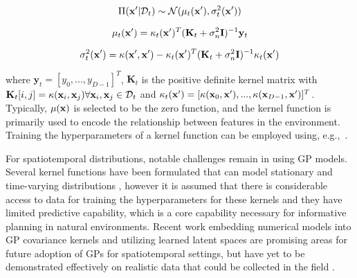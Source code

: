 \begin{equation}
    \Pi(\mathbf{x}' | \mathcal{D}_t) \sim \mathcal{N}(\mu_t(\mathbf{x}'),\sigma_t^2(\mathbf{x}'))
\end{equation}

\begin{equation}
    \mu_t(\mathbf{x}') = \kappa_t(\mathbf{x}')^T(\mathbf{K}_t + \sigma_n^2\mathbf{I})^{-1}\mathbf{y}_t
\end{equation}

\begin{equation}
    \sigma_t^2(\mathbf{x}') = \kappa(\mathbf{x}',\mathbf{x}') - \kappa_t(\mathbf{x}')^T(\mathbf{K}_t + \sigma_n^2 \mathbf{I})^{-1}\kappa_t(\mathbf{x}')
\end{equation}

\noindent where $\mathbf{y}_t = [y_0,...,y_{D-1}]^T$, $\mathbf{K}_t$ is the positive definite kernel matrix with $\mathbf{K}_t[i,j] = \kappa(\mathbf{x}_i,\mathbf{x}_j) \forall \mathbf{x}_i,\mathbf{x}_j \in \mathcal{D}_t$ and $\kappa_t(\mathbf{x}') = [\kappa(\mathbf{x}_0,\mathbf{x}'), ..., \kappa(\mathbf{x}_{D-1},\mathbf{x}')]^T$. Typically, $\mu(\mathbf{x})$ is selected to be the zero function, and the kernel function is primarily used to encode the relationship between features in the environment. Training the hyperparameters of a kernel function can be employed using, e.g.,~\cite{bergstra2011algorithms}.

For spatiotemporal distributions, notable challenges remain in using GP models. Several kernel functions have been formulated that can model stationary and time-varying distributions \autocite{singh2010modeling, garg2012learning, chen2022ak, raissi2018numerical}, however it is assumed that there is considerable access to data for training the hyperparameters for these kernels and they have limited predictive capability, which is a core capability necessary for informative planning in natural environments. Recent work embedding numerical models into GP covariance kernels \autocite{raissi2018numerical} and utilizing learned latent spaces \autocite{wilson2016deep,al2017learning,wilson2016stochastic,sun2018differentiable,wang2022physics,wan2017reduced,you2017deep,whitman2017learning,kingravi2016kernel} are promising areas for future adoption of GPs for spatiotemporal settings, but have yet to be demonstrated effectively on realistic data that could be collected in the field \autocite{ober2021promises}.



